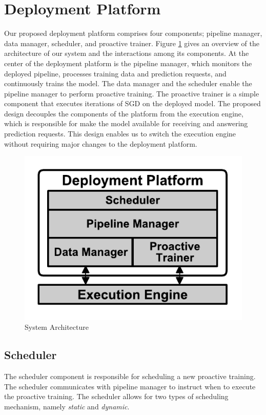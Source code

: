\section{Deployment Platform} \label{sec:system-architecture}
Our proposed deployment platform comprises four components; pipeline manager, data manager, scheduler, and proactive trainer.
Figure \ref{fig:system-architecture} gives an overview of the architecture of our system and the interactions among its components.
At the center of the deployment platform is the pipeline manager, which monitors the deployed pipeline, processes training data and prediction requests, and continuously trains the model.
The data manager and the scheduler enable the pipeline manager to perform proactive training.
The proactive trainer is a simple component that executes iterations of SGD on the deployed model.
The proposed design decouples the components of the platform from the execution engine, which is responsible for make the model available for receiving and answering prediction requests.
This design enables us to switch the execution engine without requiring major changes to the deployment platform.

\begin{figure}[t]
\centering
\includegraphics[width=\columnwidth]{../images/system-architecture.pdf}
\caption{System Architecture}
\label{fig:system-architecture}
\end{figure}

\subsection{Scheduler}\label{scheduler}
The scheduler component is responsible for scheduling a new proactive training.
The scheduler communicates with pipeline manager to instruct when to execute the proactive training.
The scheduler allows for two types of scheduling mechanism, namely \textit{static} and \textit{dynamic}.

